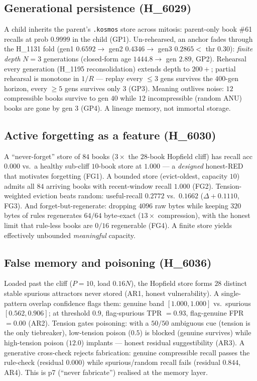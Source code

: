 \documentclass[11pt,a4paper]{article}
\begin{document}
\subsection{Generational persistence (H\_6029)}

A child inherits the parent's \texttt{.kosmos} store across mitosis: parent-only
book \#61 recalls at prob $0.9999$ in the child (GP1). Un-rehearsed, an anchor
fades through the H\_1131 fold (gen1 $0.6592 \rightarrow$ gen2 $0.4346 \rightarrow$
gen3 $0.2865 <$ thr $0.30$): \emph{finite depth} $N=3$ generations
(closed-form age $1444.8 \rightarrow$ gen $2.89$, GP2). Rehearsal every generation
(H\_1195 reconsolidation) extends depth to $200+$; partial rehearsal is monotone in
$1/R$ --- replay every $\le 3$ gens survives the $400$-gen horizon, every $\ge 5$
gens survives only $3$ (GP3). Meaning outlives noise: $12$ compressible books
survive to gen $40$ while $12$ incompressible (random ANU) books are gone by gen
$3$ (GP4). A lineage memory, not immortal storage.

\subsection{Active forgetting as a feature (H\_6030)}

A ``never-forget'' store of $84$ books ($3\times$ the $28$-book Hopfield cliff) has
recall acc $0.000$ vs.\ a healthy sub-cliff $10$-book store at $1.000$ --- a
\emph{designed} honest-RED that motivates forgetting (FG1). A bounded store
(evict-oldest, capacity $10$) admits all $84$ arriving books with recent-window
recall $1.000$ (FG2). Tension-weighted eviction beats random: useful-recall
$0.2772$ vs.\ $0.1662$ ($\Delta+0.1110$, FG3). And forget-but-regenerate: dropping
$4096$ raw bytes while keeping $320$ bytes of rules regenerates $64/64$
byte-exact ($13\times$ compression), with the honest limit that rule-less books are
$0/16$ regenerable (FG4). A finite store yields effectively unbounded
\emph{meaningful} capacity.

\subsection{False memory and poisoning (H\_6036)}

Loaded past the cliff ($P=10$, load $0.16N$), the Hopfield store forms $28$
distinct stable spurious attractors never stored (AR1, honest vulnerability). A
single-pattern overlap confidence flags them: genuine band $[1.000,1.000]$ vs.\
spurious $[0.562,0.906]$; at threshold $0.9$, flag-spurious TPR $=0.93$,
flag-genuine FPR $=0.00$ (AR2). Tension gates poisoning: with a $50/50$ ambiguous
cue (tension is the only tiebreaker), low-tension poison ($0.5$) is blocked
(genuine survives) while high-tension poison ($12.0$) implants --- honest residual
suggestibility (AR3). A generative cross-check rejects fabrication: genuine
compressible recall passes the rule-check (residual $0.000$) while spurious/random
recall fails (residual $0.844$, AR4). This is p7 (``never fabricate'') realised at
the memory layer.
\end{document}
